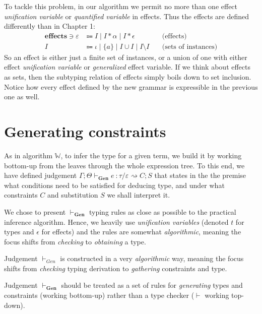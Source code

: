 \documentclass[declaration,shortabstract]{iithesis}
\theoremstyle{definition} \newtheorem{definition}{Definition}[section]
\newcommand{\gens}[6][\Gamma;\Theta]{\ensuremath{{{#1} \vdash_\textbf{Gen} {#2} \: : {#3}/{#4}} \rightsquigarrow {#5};{#6}}}
\begin{document}
To tackle this problem, in our algorithm we permit no more than one effect
\textit{unification variable} or \textit{quantified variable} in effects.
Thus the effects are defined differently than in Chapter 1:
\begin{align*} 
    \textbf{effects} \ni \varepsilon & \Coloneqq
    I \mid 
    I * \alpha \mid 
    I * \epsilon  &  \text{(effects)}
\\
    I & \Coloneqq \iota \mid \{a\} \mid I \cup I \mid I \setminus I
    \quad & \text{(sets of instances)}
\end{align*}
So an effect is either just a finite set of instances, or a union of one with either effect \textit{unification variable} or \textit{generalized} effect variable.
If we think about effects as sets,
then the subtyping relation of effects simply boils down to set inclusion.
Notice how every effect defined by the new grammar is expressible in the previous one as well.

\section{Generating constraints}
As in algorithm $\mathbb{W}$, to infer the type for a given term,
we build it by working bottom-up from the leaves through the whole expression tree.
To this end, we have defined judgement $\gens{e}{\tau}{\varepsilon}{C}{S}$ that
states in the the premise what conditions need to be satisfied for deducing type, 
and under what constraints $C$ and substitution $S$ we shall interpret it.

We chose to present  $\vdash_\textbf{Gen}$ typing rules as close as possible
to the practical inference algorithm.
Hence, we heavily use \textit{unification variables}
(denoted $t$ for types and $\epsilon$ for effects) 
and the rules are somewhat \textit{algorithmic}, meaning the focus shifts from \textit{checking} to \textit{obtaining} a type.

Judgement $\vdash_{Gen}$ is constructed in a very \textit{algorithmic} way, meaning the focus shifts from \textit{checking} typing derivation to \textit{gathering} constraints and type.

Judgement  $\vdash_\textbf{Gen}$ should be treated as a set of rules for
\textit{generating} types and constraints (working bottom-up) rather than
a type checker ($\vdash$ working top-down).
\end{document}
